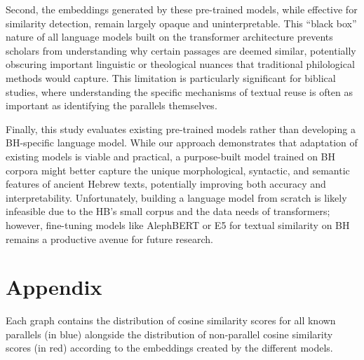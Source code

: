 \documentclass[12pt]{article}
\begin{document}
Second, the embeddings generated by these pre-trained models, while effective for similarity detection, remain largely opaque and uninterpretable. This “black box” nature of all language models built on the transformer architecture prevents scholars from understanding why certain passages are deemed similar, potentially obscuring important linguistic or theological nuances that traditional philological methods would capture. This limitation is particularly significant for biblical studies, where understanding the specific mechanisms of textual reuse is often as important as identifying the parallels themselves.

Finally, this study evaluates existing pre-trained models rather than developing a BH-specific language model. While our approach demonstrates that adaptation of existing models is viable and practical, a purpose-built model trained on BH corpora might better capture the unique morphological, syntactic, and semantic features of ancient Hebrew texts, potentially improving both accuracy and interpretability. Unfortunately, building a language model from scratch is likely infeasible due to the HB's small corpus and the data needs of transformers; however, fine-tuning models like AlephBERT or E5 for textual similarity on BH remains a productive avenue for future research.


\clearpage
\appendix
\section*{Appendix}

Each graph contains the distribution of cosine similarity scores for all known parallels (in blue) alongside the distribution of non-parallel cosine similarity scores (in red) according to the embeddings created by the different models.
\end{document}
